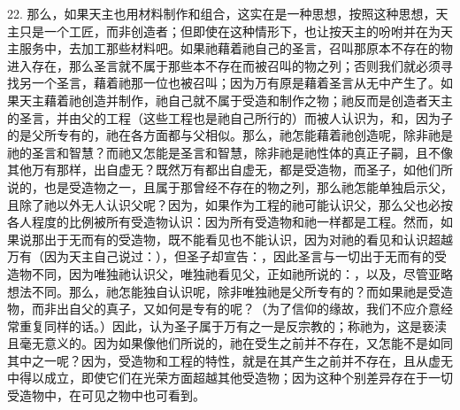 22. 那么，如果天主也用材料制作和组合，这实在是一种思想，按照这种思想，天主只是一个工匠，而非创造者；但即使在这种情形下，也让按天主的吩咐并在为天主服务中，去加工那些材料吧。如果祂藉着祂自己的圣言，召叫那原本不存在的物进入存在，那么圣言就不属于那些本不存在而被召叫的物之列；否则我们就必须寻找另一个圣言，藉着祂那一位也被召叫；因为万有原是藉着圣言从无中产生了。如果天主藉着祂创造并制作，祂自己就不属于受造和制作之物；祂反而是创造者天主的圣言，并由父的工程（这些工程也是祂自己所行的）而被人认识为，和，因为子的是父所专有的，祂在各方面都与父相似。那么，祂怎能藉着祂创造呢，除非祂是祂的圣言和智慧？而祂又怎能是圣言和智慧，除非祂是祂性体的真正子嗣，且不像其他万有那样，出自虚无？既然万有都出自虚无，都是受造物，而圣子，如他们所说的，也是受造物之一，且属于那曾经不存在的物之列，那么祂怎能单独启示父，且除了祂以外无人认识父呢？因为，如果作为工程的祂可能认识父，那么父也必按各人程度的比例被所有受造物认识：因为所有受造物和祂一样都是工程。然而，如果说那出于无而有的受造物，既不能看见也不能认识，因为对祂的看见和认识超越万有（因为天主自己说过：），但圣子却宣告：，因此圣言与一切出于无而有的受造物不同，因为唯独祂认识父，唯独祂看见父，正如祂所说的：，以及，尽管亚略想法不同。那么，祂怎能独自认识呢，除非唯独祂是父所专有的？而如果祂是受造物，而非出自父的真子，又如何是专有的呢？（为了信仰的缘故，我们不应介意经常重复同样的话。）因此，认为圣子属于万有之一是反宗教的；称祂为，这是亵渎且毫无意义的。因为如果像他们所说的，祂在受生之前并不存在，又怎能不是如同其中之一呢？因为，受造物和工程的特性，就是在其产生之前并不存在，且从虚无中得以成立，即使它们在光荣方面超越其他受造物；因为这种个别差异存在于一切受造物中，在可见之物中也可看到。\par

